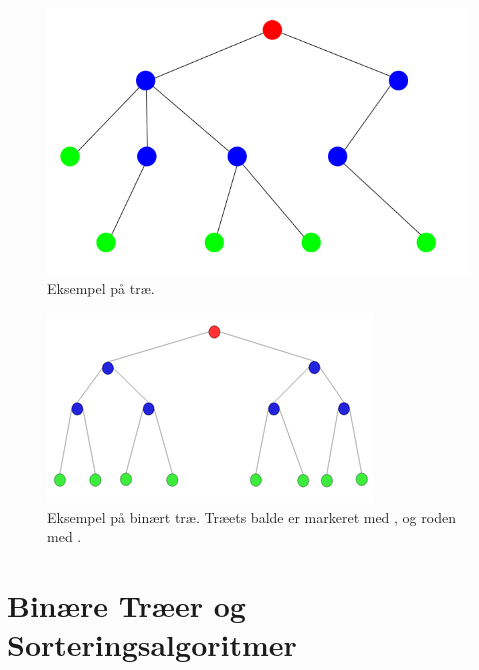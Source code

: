 \begin{figure}
	\begin{center}
		\includegraphics[scale=0.35]{../img/tree.png}
	\end{center}
	\caption{Eksempel på træ.}
	\label{fig:Eksempel på træ.}
\end{figure}



\begin{figure}
	\begin{center}
		\includegraphics[scale=1]{../img/binary_tree.png}
	\end{center}
	\caption{Eksempel på binært træ. Træets balde er markeret med , og roden med . \cite{binaert-trae}}
	\label{fig:Eksempel på binært træ}
\end{figure} 



\section{Binære Træer og Sorteringsalgoritmer}
\label{sec:Binære Træer og Sorteringsalgoritmer}

